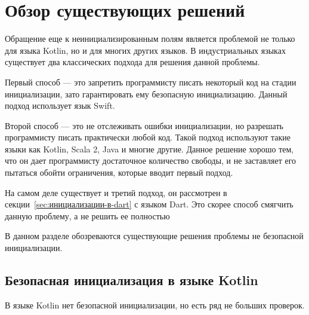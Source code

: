 \chapter{Обзор существующих решений}\label{ch:обзор-существующих-решений}

Обращение еще к неинициализированным полям является проблемой не только для языка Kotlin, но и для многих других языков.
В индустриальных языках существует два классических подхода для решения данной проблемы.

Первый способ --- это запретить программисту писать некоторый код на стадии инициализации,
зато гарантировать ему безопасную инициализацию.
Данный подход использует язык Swift.

Второй способ --- это не отслеживать ошибки инициализации, но разрешать программисту писать практически любой код.
Такой подход используют такие языки как Kotlin, Scala 2, Java и многие другие.
Данное решение хорошо тем, что он дает программисту достаточное количество свободы,
и не заставляет его пытаться обойти ограничения, которые вводит первый подход.

На самом деле существует и третий подход, он рассмотрен в секции~\ref{sec:инициализации-в-dart} с языком Dart.
Это скорее способ смягчить данную проблему, а не решить ее полностью

В данном разделе обозреваются существующие решения проблемы не безопасной инициализации.


\section{Безопасная инициализация в языке Kotlin}\label{sec:безопасная-инициализация-в-языке-kotlin}

В языке Kotlin нет безопасной инициализации, но есть ряд не больших проверок.

